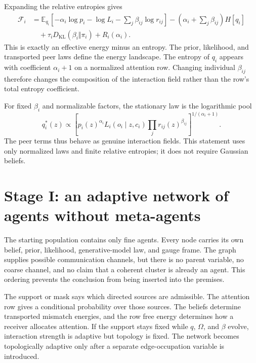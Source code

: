 \documentclass[11pt,letterpaper]{article}
\newcommand{\KL}{D_{\mathrm{KL}}}
\newcommand{\E}{\mathbb E}
\newcommand{\cF}{\mathcal F}
\begin{document}
Expanding the relative entropies gives
\begin{align}
 \cF_i
 &=\E_{q_i}\left[
 -\alpha_i\log p_i
 -\log L_i
 -\sum_j\beta_{ij}\log r_{ij}
 \right]
 -\left(\alpha_i+\sum_j\beta_{ij}\right)H[q_i]
 \nonumber\\
 &\quad+\tau_i\KL(\beta_i\Vert\pi_i)+R_i(\alpha_i).
 \label{eq:helmholtz-expansion}
\end{align}
This is exactly an effective energy minus an entropy.  The prior, likelihood, and transported peer laws define the energy landscape.  The entropy of $q_i$ appears with coefficient $\alpha_i+1$ on a normalized attention row.  Changing individual $\beta_{ij}$ therefore changes the composition of the interaction field rather than the row's total entropy coefficient.

For fixed $\beta_i$ and normalizable factors, the stationary law is the logarithmic pool
\begin{equation}
 q_i^*(z)
 \propto
 \left[
 p_i(z)^{\alpha_i}
 L_i(o_i\mid z,c_i)
 \prod_j r_{ij}(z)^{\beta_{ij}}
 \right]^{1/(\alpha_i+1)}.
 \label{eq:belief-geometric-pool}
\end{equation}
The peer terms thus behave as genuine interaction fields.  This statement uses only normalized laws and finite relative entropies; it does not require Gaussian beliefs.

\section{Stage I: an adaptive network of agents without meta-agents}

The starting population contains only fine agents.  Every node carries its own belief, prior, likelihood, generative-model law, and gauge frame.  The graph supplies possible communication channels, but there is no parent variable, no coarse channel, and no claim that a coherent cluster is already an agent.  This ordering prevents the conclusion from being inserted into the premises.

The support or mask says which directed sources are admissible.  The attention row gives a conditional probability over those sources.  The beliefs determine transported mismatch energies, and the row free energy determines how a receiver allocates attention.  If the support stays fixed while $q$, $\Omega$, and $\beta$ evolve, interaction strength is adaptive but topology is fixed.  The network becomes topologically adaptive only after a separate edge-occupation variable is introduced.
\end{document}
